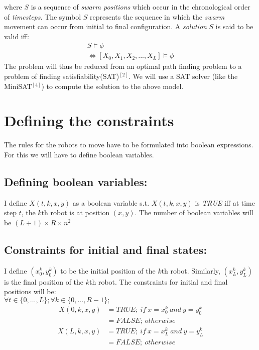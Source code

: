 \documentclass{article}[11pt]
\begin{document}
		where $S$ is a sequence of \textit{swarm positions} which occur in the chronological order of \textit{timesteps}.
		The symbol $S$ represents the sequence in which the \textit{swarm} movement can occur from initial to final configuration.
		A \textit{solution} $S$ is said to be valid iff:
		\begin{gather}
				S \models \phi \\
			\Leftrightarrow  [X_0, X_1, X_2, . . . , X_L] \models \phi
		\end{gather}
		The problem will thus be reduced from an optimal path finding problem to a problem of finding satisfiability(SAT)$^{[2]}$. 
		We will use a SAT solver (like the MiniSAT$^{[4]}$) to compute the solution to the above model.

	\section{Defining the constraints}
		The rules for the robots to move have to be formulated into boolean expressions. For this we will have to define boolean variables.
		\subsection{Defining boolean variables:}
			I define $X(t, k, x, y)$ as a boolean variable s.t. $X(t, k, x, y)$ is \textit{TRUE} iff at time step $t$, the $k$th robot is at position $(x,y)$. The number of boolean variables will be $(L+1) \times R \times n^2$
		
		\subsection{Constraints for initial and final states:}
			I define $(x_0^k,y_0^k)$ to be the initial position of the $k$th robot.
			Similarly, $(x_L^k, y_L^k)$ is the final position of the $k$th robot.
			The constraints for initial and final positions will be: \\
			$\forall{t \in \{0,...,L\}};\forall{k \in \{0,...,R-1\}};$
			\begin{equation*}
			\begin{split}
				X(0, k, x, y) &= TRUE;\ if \ x = x_0^k \ and \ y=y_0^k\\
				                                    &= FALSE;\ otherwise
			\end{split}
			\end{equation*}
			\begin{equation*}
			\begin{split}
				X(L, k, x, y) &= TRUE;\ if \ x = x_L^k \ and \ y=y_L^k \\
				                                    &= FALSE;\ otherwise
			\end{split}
			\end{equation*}
\end{document}

